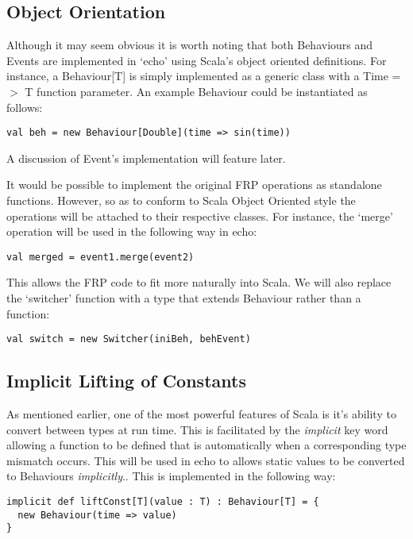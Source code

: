     \subsection{Object Orientation}
      Although it may seem obvious it is worth noting that both Behaviours and Events are implemented in
      `echo' using Scala's object oriented definitions. For instance, a Behaviour[T] is simply
      implemented as a generic class with a Time =$>$ T function parameter. An example Behaviour
      could be instantiated as follows:
 
\begin{verbatim}
val beh = new Behaviour[Double](time => sin(time))
\end{verbatim}  

      A discussion of Event's implementation will feature later.
      
      It would be possible to implement the original FRP operations as standalone functions. However, so
      as to conform to Scala Object Oriented style the operations will be attached to their respective
      classes. For instance, the `merge' operation will be used in the following way in echo:
      
\begin{verbatim}
val merged = event1.merge(event2)
\end{verbatim}

    This allows the FRP code to fit more naturally into Scala. We will also replace the `switcher' function
    with a type that extends Behaviour rather than a function:
    
\begin{verbatim}
val switch = new Switcher(iniBeh, behEvent)
\end{verbatim}

    \subsection{Implicit Lifting of Constants}
      As mentioned earlier, one of the most powerful features of Scala is it's ability to convert between
      types at run time. This is facilitated by the \emph{implicit} key word allowing a function to be defined
      that is automatically when a corresponding type mismatch occurs. This will be used in echo to allows 
      static values to be converted to Behaviours \emph{implicitly}.. This is implemented in the following way:  

\begin{verbatim}
implicit def liftConst[T](value : T) : Behaviour[T] = {
  new Behaviour(time => value)
}
\end{verbatim}              
      
